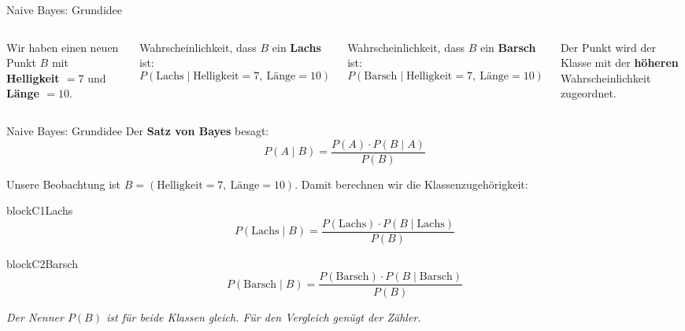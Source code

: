\begin{frame}{Naive Bayes: Grundidee}
\begin{columns}
Wir haben einen neuen Punkt $B$ mit \textbf{Helligkeit $= 7$} und
\textbf{Länge $= 10$}.

\vspace{0.6em}
Wahrscheinlichkeit, dass $B$ ein \textbf{Lachs} ist:
\[
  P(\text{Lachs} \mid \text{Helligkeit}=7,\ \text{Länge}=10)
\]

\vspace{0.4em}
Wahrscheinlichkeit, dass $B$ ein \textbf{Barsch} ist:
\[
  P(\text{Barsch} \mid \text{Helligkeit}=7,\ \text{Länge}=10)
\]

\vspace{0.4em}
Der Punkt wird der Klasse mit der \textbf{höheren} Wahrscheinlichkeit
zugeordnet.

\centering
{}
\end{columns}
\end{frame}



\begin{frame}{Naive Bayes: Grundidee}
Der \textbf{Satz von Bayes} besagt:
\[
  P(A \mid B) = \frac{P(A)\cdot P(B \mid A)}{P(B)}
\]

Unsere Beobachtung ist $B = (\text{Helligkeit}=7,\ \text{Länge}=10)$. Damit
berechnen wir die Klassenzugehörigkeit:

\begin{blockrow}
  \begin{blockcol}{0.47\textwidth}{blockC1}{Lachs}
\footnotesize
\[
  P(\text{Lachs} \mid B) =
  \frac{P(\text{Lachs})\cdot P(B \mid \text{Lachs})}{P(B)}
\]
  \end{blockcol}

  \begin{blockcol}{0.48\textwidth}{blockC2}{Barsch}
\footnotesize
\[
  P(\text{Barsch} \mid B) =
  \frac{P(\text{Barsch})\cdot P(B \mid \text{Barsch})}{P(B)}
\]
  \end{blockcol}
\end{blockrow}

\vspace{0.4em}
{\itshape Der Nenner $P(B)$ ist für beide Klassen gleich. Für den
Vergleich genügt der Zähler.}
\end{frame}


